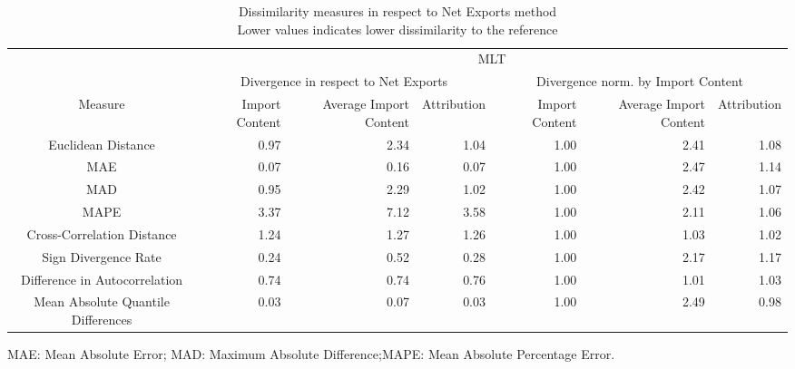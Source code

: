 \begin{table}[t]
\caption*{
{\large Dissimilarity measures in respect to Net Exports method} \\ 
{\small Lower values indicates lower dissimilarity to the reference}
} 
\fontsize{15.0pt}{18.0pt}\selectfont
\begin{tabular*}{\linewidth}{@{\extracolsep{\fill}}crrrrrr}
\toprule
 & \multicolumn{6}{c}{MLT} \\ 
\cmidrule(lr){2-7}
 & \multicolumn{3}{c}{Divergence in respect to Net Exports} & \multicolumn{3}{c}{Divergence norm. by Import Content} \\ 
\cmidrule(lr){2-4} \cmidrule(lr){5-7}
Measure & Import Content & Average Import Content & Attribution & Import Content & Average Import Content & Attribution \\ 
\midrule\addlinespace[2.5pt]
Euclidean Distance & 0.97 & 2.34 & 1.04 & 1.00 & 2.41 & 1.08 \\ 
MAE & 0.07 & 0.16 & 0.07 & 1.00 & 2.47 & 1.14 \\ 
MAD & 0.95 & 2.29 & 1.02 & 1.00 & 2.42 & 1.07 \\ 
MAPE & 3.37 & 7.12 & 3.58 & 1.00 & 2.11 & 1.06 \\ 
Cross-Correlation Distance & 1.24 & 1.27 & 1.26 & 1.00 & 1.03 & 1.02 \\ 
Sign Divergence Rate & 0.24 & 0.52 & 0.28 & 1.00 & 2.17 & 1.17 \\ 
Difference in Autocorrelation & 0.74 & 0.74 & 0.76 & 1.00 & 1.01 & 1.03 \\ 
Mean Absolute Quantile Differences & 0.03 & 0.07 & 0.03 & 1.00 & 2.49 & 0.98 \\ 
\bottomrule
\end{tabular*}
\begin{minipage}{\linewidth}
MAE: Mean Absolute Error; MAD: Maximum Absolute Difference;MAPE: Mean Absolute Percentage Error.\\
\end{minipage}
\end{table}

